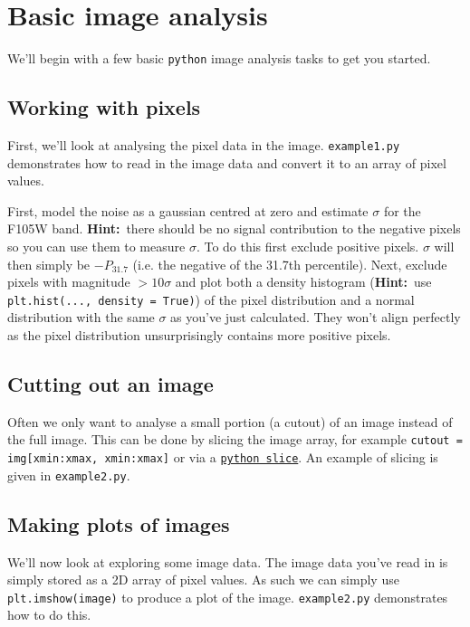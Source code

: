 \documentclass{article}
\newcommand{\hint}{\textbf{Hint:}}
\begin{document}
\section{Basic image analysis} %

We'll begin with a few basic \texttt{python} image analysis tasks to get you started.

\subsection{Working with pixels}

First, we'll look at analysing the pixel data in the image. \texttt{example1.py} demonstrates how to read in the image data and convert it to an array of pixel values.

\begin{question}
First, model the noise as a gaussian centred at zero and estimate $\sigma$ for the F105W band. \hint\ there should be no signal contribution to the negative pixels so you can use them to measure $\sigma$. To do this first exclude positive pixels. $\sigma$ will then simply be $-P_{31.7}$ (i.e. the negative of the 31.7th percentile). Next, exclude pixels with magnitude $>10\sigma$ and plot both a density histogram (\hint\ use \texttt{plt.hist(..., density = True)}) of the pixel distribution and a normal distribution with the same $\sigma$ as you've just calculated. They won't align perfectly as the pixel distribution unsurprisingly contains more positive pixels.
\end{question}

\subsection{Cutting out an image}

Often we only want to analyse a small portion (a cutout) of an image instead of the full image. This can be done by slicing the image array, for example  \texttt{cutout = img[xmin:xmax, xmin:xmax]} or via a \href{https://docs.python.org/3/library/functions.html?highlight=slice#slice}{\texttt{python slice}}. An example of slicing is given in \texttt{example2.py}.

\subsection{Making plots of images}

We'll now look at exploring some image data. The image data you've read in is simply stored as a 2D array of pixel values. As such we can simply use \texttt{plt.imshow(image)} to produce a plot of the image. \texttt{example2.py} demonstrates how to do this.
\end{document}
